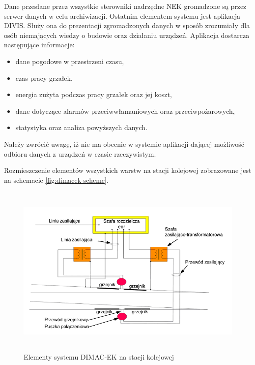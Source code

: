 Dane przesłane przez wszystkie sterowniki nadrzędne NEK gromadzone są przez serwer danych w celu archiwizacji. Ostatnim elementem systemu jest aplikacja DIVIS. Służy ona do prezentacji zgromadzonych danych w sposób zrozumiały dla osób niemających wiedzy o budowie oraz działaniu urządzeń. Aplikacja dostarcza następujące informacje:


\begin{itemize}
\item dane pogodowe w przestrzeni czasu,
\item czas pracy grzałek,
\item energia zużyta podczas pracy grzałek oraz jej koszt,
\item dane dotyczące alarmów przeciwwłamaniowych oraz przeciwpożarowych,
\item statystyka oraz analiza powyższych danych.
\end{itemize}

Należy zwrócić uwagę, iż nie ma obecnie w systemie aplikacji dającej możliwość odbioru danych z urządzeń w czasie rzeczywistym.

Rozmieszczenie elementów wszystkich warstw na stacji kolejowej zobrazowane jest na schemacie \ref{fig:dimacek-scheme}.

\begin{figure}[t]
	\includegraphics[height=85mm]{./img/dimacek_tory.png}
	\caption[Elementy systemu DIMAC-EK na stacji kolejowej]{Elementy systemu DIMAC-EK na stacji kolejowej \cite{arex-materials}}
	\label{fig:dimacek_tory}
\end{figure}

